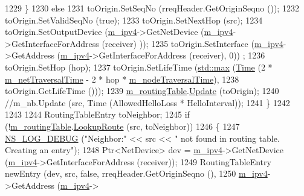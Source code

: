 \begin{DoxyCode}
1229         \}
1230       \textcolor{keywordflow}{else}
1231         toOrigin.SetSeqNo (rreqHeader.GetOriginSeqno ());
1232       toOrigin.SetValidSeqNo (\textcolor{keyword}{true});
1233       toOrigin.SetNextHop (src);
1234       toOrigin.SetOutputDevice (\hyperlink{classns3_1_1aodv_1_1RoutingProtocol_aee33006b1f9d8b24d4722037ff3fec98}{m\_ipv4}->GetNetDevice (\hyperlink{classns3_1_1aodv_1_1RoutingProtocol_aee33006b1f9d8b24d4722037ff3fec98}{m\_ipv4}->GetInterfaceForAddress (receiver)
      ));
1235       toOrigin.SetInterface (\hyperlink{classns3_1_1aodv_1_1RoutingProtocol_aee33006b1f9d8b24d4722037ff3fec98}{m\_ipv4}->GetAddress (\hyperlink{classns3_1_1aodv_1_1RoutingProtocol_aee33006b1f9d8b24d4722037ff3fec98}{m\_ipv4}->GetInterfaceForAddress (receiver), 0))
      ;
1236       toOrigin.SetHop (hop);
1237       toOrigin.SetLifeTime (\hyperlink{80211b_8c_affe776513b24d84b39af8ab0930fef7f}{std::max} (\hyperlink{namespacens3_1_1TracedValueCallback_a7ffd3e7c142ffe7c8a1d2db9b8de38ec}{Time} (2 * \hyperlink{classns3_1_1aodv_1_1RoutingProtocol_a4642e67ba68a7ef40405f5773650ea1a}{m\_netTraversalTime} - 2 * hop 
      * \hyperlink{classns3_1_1aodv_1_1RoutingProtocol_ad467863779ea1559ad5942ff6c24a706}{m\_nodeTraversalTime}),
1238                                       toOrigin.GetLifeTime ()));
1239       \hyperlink{classns3_1_1aodv_1_1RoutingProtocol_a4e1003a34c8adc96db71096d88c98ae0}{m\_routingTable}.\hyperlink{classns3_1_1aodv_1_1RoutingTable_a39fb5335110164f4c1b97682a3812dc1}{Update} (toOrigin);
1240       \textcolor{comment}{//m\_nb.Update (src, Time (AllowedHelloLoss * HelloInterval));}
1241     \}
1242 
1243 
1244   RoutingTableEntry toNeighbor;
1245   \textcolor{keywordflow}{if} (!\hyperlink{classns3_1_1aodv_1_1RoutingProtocol_a4e1003a34c8adc96db71096d88c98ae0}{m\_routingTable}.\hyperlink{classns3_1_1aodv_1_1RoutingTable_a90cbc8a2c65cd68ccdaf768fcbb5d723}{LookupRoute} (src, toNeighbor))
1246     \{
1247       \hyperlink{group__logging_ga413f1886406d49f59a6a0a89b77b4d0a}{NS\_LOG\_DEBUG} (\textcolor{stringliteral}{"Neighbor:"} << src << \textcolor{stringliteral}{" not found in routing table. Creating an entry"}); 
1248       Ptr<NetDevice> dev = \hyperlink{classns3_1_1aodv_1_1RoutingProtocol_aee33006b1f9d8b24d4722037ff3fec98}{m\_ipv4}->GetNetDevice (\hyperlink{classns3_1_1aodv_1_1RoutingProtocol_aee33006b1f9d8b24d4722037ff3fec98}{m\_ipv4}->GetInterfaceForAddress (receiver));
1249       RoutingTableEntry newEntry (dev, src, \textcolor{keyword}{false}, rreqHeader.GetOriginSeqno (),
1250                                               \hyperlink{classns3_1_1aodv_1_1RoutingProtocol_aee33006b1f9d8b24d4722037ff3fec98}{m\_ipv4}->GetAddress (\hyperlink{classns3_1_1aodv_1_1RoutingProtocol_aee33006b1f9d8b24d4722037ff3fec98}{m\_ipv4}->

\end{DoxyCode}
